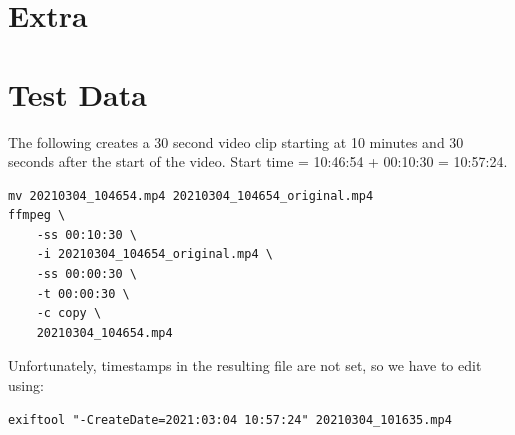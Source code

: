 \documentclass[12pt,letterpaper,english,bibliography=totocnumbered, abstract=on]{scrartcl}
\begin{document}
\section{Extra}

\cite{aubreymooreSetAutomatedRoadside2020}

\cite{onepanelinc.AIPipelineOperations2020}

\cite{onepanelinc.ScopeWorkObject2020}

\newpage
\section{Test Data}

The following creates a 30 second video clip starting at 10 minutes and 30 seconds after the start of the video.
Start time = 10:46:54 + 00:10:30 = 10:57:24.

\begin{verbatim}
mv 20210304_104654.mp4 20210304_104654_original.mp4
ffmpeg \
    -ss 00:10:30 \
    -i 20210304_104654_original.mp4 \
    -ss 00:00:30 \
    -t 00:00:30 \
    -c copy \
    20210304_104654.mp4
\end{verbatim}

Unfortunately, timestamps in the resulting file are not set, so we have to edit using:

\begin{verbatim}
exiftool "-CreateDate=2021:03:04 10:57:24" 20210304_101635.mp4
\end{verbatim}


\printbibliography	
\end{document}
